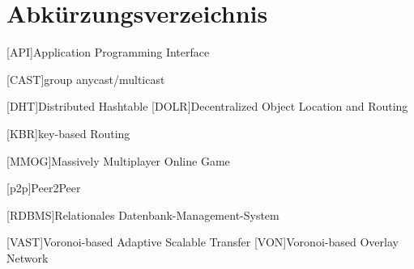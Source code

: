 \chapter*{Abkürzungsverzeichnis}

\pagestyle{useheadings}

\vspace{\topskip}


\begin{acronym}[xxxxxxxxxxxx]
	\setlength{\itemsep}{-\parsep}
	\setlength{\itemindent}{1.5em}
	[API]{Application Programming Interface}

	\vspace{\parsep} 
 [CAST]{group anycast/multicast}

	\vspace{\parsep}
	 [DHT]{Distributed Hashtable}
	[DOLR]{Decentralized Object Location and Routing}



	
	
\vspace{\parsep}
[KBR]{key-based Routing}




	\vspace{\parsep}
	[MMOG]{Massively Multiplayer Online Game}


	
	\vspace{\parsep}
	[p2p]{Peer2Peer}

	

	[RDBMS]{Relationales Datenbank-Management-System}
	
	


	\vspace{\parsep}
	[VAST]{Voronoi-based Adaptive Scalable Transfer}
	[VON]{Voronoi-based Overlay Network}





\end{acronym}
